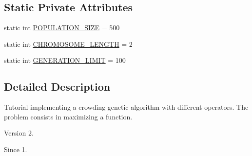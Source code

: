 \subsection*{Static Private Attributes}
\begin{DoxyCompactItemize}
\item 
static int \hyperlink{classjenes_1_1tutorials_1_1problem10_1_1_crowding_g_a_example_a4a9e06723f82ad9881314eac82f4765a}{P\-O\-P\-U\-L\-A\-T\-I\-O\-N\-\_\-\-S\-I\-Z\-E} = 500
\item 
static int \hyperlink{classjenes_1_1tutorials_1_1problem10_1_1_crowding_g_a_example_adcffdbe7868ca17e745ff795d7c5c1f8}{C\-H\-R\-O\-M\-O\-S\-O\-M\-E\-\_\-\-L\-E\-N\-G\-T\-H} = 2
\item 
static int \hyperlink{classjenes_1_1tutorials_1_1problem10_1_1_crowding_g_a_example_abaf536c5e1e253b8bf8a6416985f1967}{G\-E\-N\-E\-R\-A\-T\-I\-O\-N\-\_\-\-L\-I\-M\-I\-T} = 100
\end{DoxyCompactItemize}


\subsection{Detailed Description}
Tutorial implementing a crowding genetic algorithm with different operators. The problem consists in maximizing a function.

\begin{DoxyVersion}{Version}
2. 
\end{DoxyVersion}
\begin{DoxySince}{Since}
1. 
\end{DoxySince}


